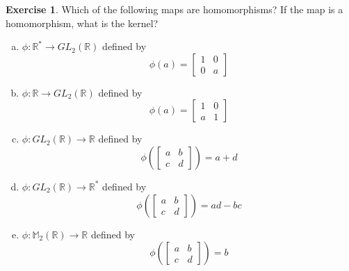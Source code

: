 \documentclass{article}
\theoremstyle{definition}
\newtheorem{theorem}{Exercise}[section]
\newcommand{\R}{\mathbb{R}}
\begin{document}
	\setcounter{section}{11}
	\setcounter{theorem}{1}
	\begin{theorem}
		Which of the following maps are homomorphisms? If the map is a homomorphism, what is the kernel?
		\begin{enumerate}[(a)]
			\item $\phi:\R^*\to GL_2\left(\R\right)$ defined by \[\phi(a)=\begin{bmatrix}1&0\\0&a\end{bmatrix}\]
			
			\item $\phi:\R\to GL_2\left(\R\right)$ defined by \[\phi(a)=\begin{bmatrix}1&0\\a&1\end{bmatrix}\]
			
			\item $\phi:GL_2\left(\R\right)\to\R$ defined by \[\phi\left(\begin{bmatrix} a&b\\c&d \end{bmatrix}\right)=a+d\]
			
			\item $\phi:GL_2\left(\R\right)\to\R^*$ defined by \[\phi\left(\begin{bmatrix} a&b\\c&d \end{bmatrix}\right)=ad-bc\]
			
			\item $\phi:\mathbb{M}_2\left(\R\right)\to\R$ defined by \[\phi\left(\begin{bmatrix} a&b\\c&d \end{bmatrix}\right)=b\]
		\end{enumerate}
	\end{theorem}
\end{document}
